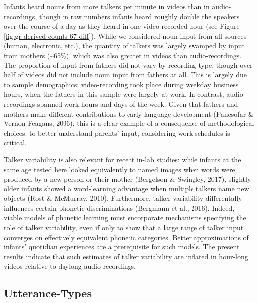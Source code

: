 \documentclass[man]{apa6}
\theoremstyle{definition}
\theoremstyle{definition}
\theoremstyle{definition}
\theoremstyle{remark}
\begin{document}
Infants heard nouns from more talkers per minute in videos than in
audio-recordings, though in raw numbers infants heard roughly double the
speakers over the course of a day as they heard in one video-recorded
hour (see Figure \ref{fig:gr-derived-counts-67-diff}). While we
considered noun input from all sources (human, electronic, etc.), the
quantity of talkers was largely swamped by input from mothers
(\textasciitilde{}65\%), which was also greater in videos than
audio-recordings. The proportion of input from fathers did not vary by
recording-type, though over half of videos did not include noun input
from fathers at all. This is largely due to sample demographics:
video-recording took place during weekday business hours, when the
fathers in this sample were largely at work. In contrast,
audio-recordings spanned work-hours and days of the week. Given that
fathers and mothers make different contributions to early language
development (Pancsofar \& Vernon-Feagans, 2006), this is a clear example
of a consequence of methodological choices: to better understand
parents' input, considering work-schedules is critical.

Talker variability is also relevant for recent in-lab studies: while
infants at the same age tested here looked equivalently to named images
when words were produced by a new person or their mother (Bergelson \&
Swingley, 2017), slightly older infants showed a word-learning advantage
when multiple talkers name new objects (Rost \& McMurray, 2010).
Furthermore, talker variability differentally influences certain
phonetic discriminations (Bergmann et al., 2016). Indeed, viable models
of phonetic learning must encorporate mechanisms specifying the role of
talker variability, even if only to show that a large range of talker
input converges on effectively equivalent phonetic categories. Better
approximations of infants' quotidian experiences are a prerequisite for
such models. The present results indicate that such estimates of talker
variability are inflated in hour-long videos relative to daylong
audio-recordings.

\subsection{Utterance-Types}\label{utterance-types}
\end{document}
